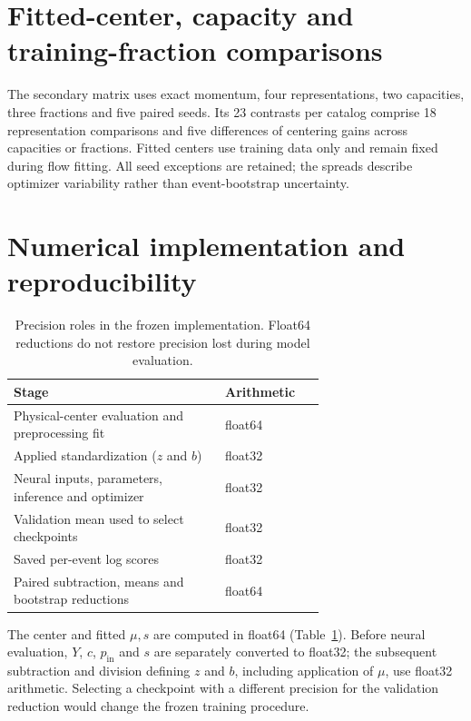 \documentclass[smallextended,epjc3]{svjour3}
\newcommand{\pin}{p_{\mathrm{in}}}
\begin{document}
\section{Fitted-center, capacity and training-fraction comparisons}
\label{sec:secondary}

The secondary matrix uses exact momentum, four representations, two capacities,
three fractions and five paired seeds. Its 23 contrasts per catalog comprise
18 representation comparisons and five differences of centering gains across
capacities or fractions. Fitted centers use training data only and remain
fixed during flow fitting. All seed exceptions are retained; the spreads
describe optimizer variability rather than event-bootstrap uncertainty.


\clearpage
\section{Numerical implementation and reproducibility}
\label{sec:numerical_boundary}

\begin{table}[!htbp]
\centering
\caption{Precision roles in the frozen implementation. Float64 reductions
do not restore precision lost during model evaluation.}
\label{tab:supp_precision}
\begin{tabular}{p{0.68\linewidth}l}
\toprule Stage & Arithmetic \\
\midrule
Physical-center evaluation and preprocessing fit & float64 \\
Applied standardization ($z$ and $b$) & float32 \\
Neural inputs, parameters, inference and optimizer & float32 \\
Validation mean used to select checkpoints & float32 \\
Saved per-event log scores & float32 \\
Paired subtraction, means and bootstrap reductions & float64 \\
\bottomrule
\end{tabular}
\end{table}

The center and fitted $\mu,s$ are computed in float64 (Table~\ref{tab:supp_precision}). Before neural
evaluation, $Y$, $c$, $\pin$ and $s$ are separately converted to float32;
the subsequent subtraction and division defining $z$ and $b$, including
application of $\mu$, use float32 arithmetic. Selecting a checkpoint with
a different precision for the validation reduction would change the frozen
training procedure.
\end{document}
